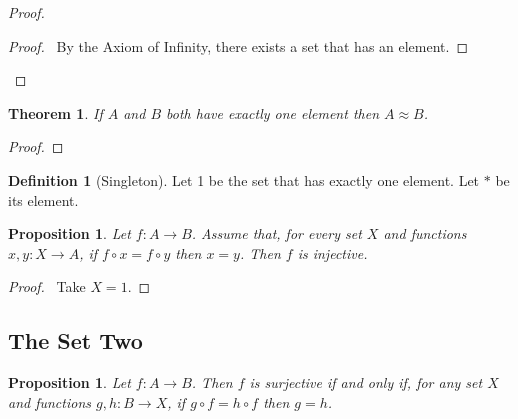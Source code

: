 \documentclass{book}
\let\qed\relax
\newtheorem{prop}[ax]{Proposition}
\newtheorem{thm}[ax]{Theorem}
\theoremstyle{definition}
\newtheorem{df}[ax]{Definition}
\begin{document}
\begin{proof}
\pf
{}
\begin{proof}
	\pf\ By the Axiom of Infinity, there exists a set that has an element.
\end{proof}
\qed
\end{proof}

\begin{thm}
If $A$ and $B$ both have exactly one element then $A \approx B$.
\end{thm}

\begin{proof}
\pf
{}
\qed
\end{proof}

\begin{df}[Singleton]
Let 1 be the set that has exactly one element. Let $*$ be its element.
\end{df}

\begin{prop}
Let $f : A \rightarrow B$. Assume that, for every set $X$ and functions $x,y : X \rightarrow A$, if $f \circ x = f \circ y$ then $x = y$. Then $f$ is injective.
\end{prop}

\begin{proof}
\pf\ Take $X = 1$. \qed
\end{proof}

\subsection{The Set Two}

\begin{prop}
\label{prop:surjective}
Let $f : A \rightarrow B$. Then $f$ is surjective if and only if, for any set $X$ and functions $g,h : B \rightarrow X$, if $g \circ f = h \circ f$ then $g = h$.
\end{prop}
\end{document}
